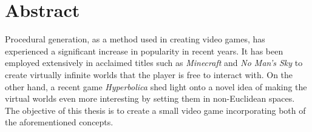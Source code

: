 \section{Abstract}
Procedural generation, as a method used in creating video games, has experienced a significant increase in popularity in recent years.
It has been employed extensively in acclaimed titles such as \textit{Minecraft} and \textit{No Man's Sky} to create virtually infinite worlds that the player is free to interact with.
On the other hand, a recent game \textit{Hyperbolica} shed light onto a novel idea of making the virtual worlds even more interesting by setting them in non-Euclidean spaces.
The objective of this thesis is to create a small video game incorporating both of the aforementioned concepts.